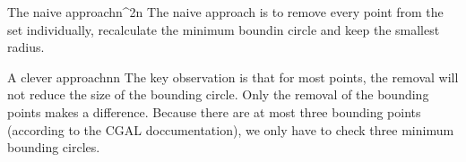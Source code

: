 \documentclass{writeup}
\begin{document}
\begin{solutions}
  \begin{solution}{The naive approach}{n^{2}}{n}
    The naive approach is to remove every point from the set individually, recalculate the minimum boundin circle and keep the smallest radius.
  \end{solution}

  \begin{solution}{A clever approach}{n}{n}
    The key observation is that for most points, the removal will not reduce the size of the bounding circle.
    Only the removal of the bounding points makes a difference.
    Because there are at most three bounding points (according to the CGAL doccumentation), we only have to check three minimum bounding circles.
  \end{solution}
\end{solutions}
\end{document}
